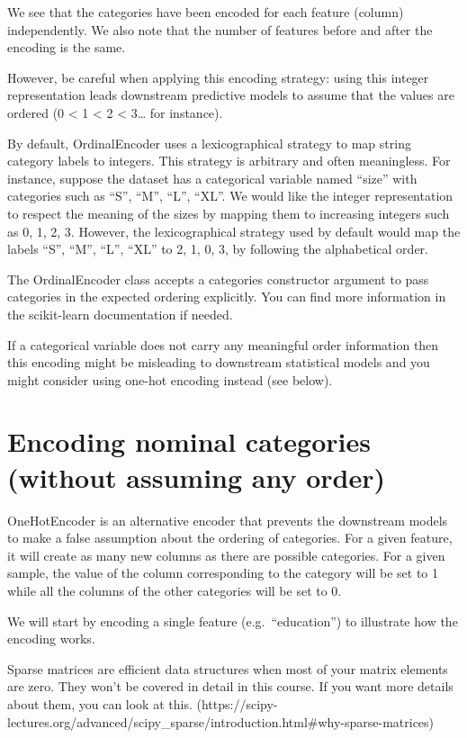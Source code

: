 \documentclass[
  letterpaper,
  DIV=11,
  numbers=noendperiod,
  oneside]{scrreprt}
\begin{document}
We see that the categories have been encoded for each feature (column)
independently. We also note that the number of features before and after
the encoding is the same.

However, be careful when applying this encoding strategy: using this
integer representation leads downstream predictive models to assume that
the values are ordered (0 \textless{} 1 \textless{} 2 \textless{}
3\ldots{} for instance).

By default, OrdinalEncoder uses a lexicographical strategy to map string
category labels to integers. This strategy is arbitrary and often
meaningless. For instance, suppose the dataset has a categorical
variable named ``size'' with categories such as ``S'', ``M'', ``L'',
``XL''. We would like the integer representation to respect the meaning
of the sizes by mapping them to increasing integers such as 0, 1, 2, 3.
However, the lexicographical strategy used by default would map the
labels ``S'', ``M'', ``L'', ``XL'' to 2, 1, 0, 3, by following the
alphabetical order.

The OrdinalEncoder class accepts a categories constructor argument to
pass categories in the expected ordering explicitly. You can find more
information in the scikit-learn documentation if needed.

If a categorical variable does not carry any meaningful order
information then this encoding might be misleading to downstream
statistical models and you might consider using one-hot encoding instead
(see below).

\hypertarget{encoding-nominal-categories-without-assuming-any-order}{%
\section{Encoding nominal categories (without assuming any
order)}\label{encoding-nominal-categories-without-assuming-any-order}}

OneHotEncoder is an alternative encoder that prevents the downstream
models to make a false assumption about the ordering of categories. For
a given feature, it will create as many new columns as there are
possible categories. For a given sample, the value of the column
corresponding to the category will be set to 1 while all the columns of
the other categories will be set to 0.

We will start by encoding a single feature (e.g.~``education'') to
illustrate how the encoding works.

Sparse matrices are efficient data structures when most of your matrix
elements are zero. They won't be covered in detail in this course. If
you want more details about them, you can look at this.
(https://scipy-lectures.org/advanced/scipy\_sparse/introduction.html\#why-sparse-matrices)
\end{document}
